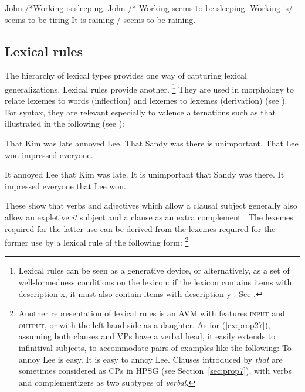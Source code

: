 \documentclass[output=paper
	        ,collection
	        ,collectionchapter
 	        ,biblatex
                ,babelshorthands
                ,newtxmath
                ,draftmode
                ,colorlinks, citecolor=brown
]{langscibook}
\begin{document}
\ea\label{ex:prop25}
	\ea John /*Working is sleeping.
	\ex John /* Working seems to be sleeping.
	\ex Working is/ seems to be tiring
	\ex It is raining / seems to be raining.
	\z
\z

\subsection{Lexical rules}\label{sec:prop4.2}
\label{prop:sec-lex-rules}

The hierarchy of lexical types provides one way of capturing lexical generalizations. Lexical rules provide another.%
%
\footnote{Lexical rules can be seen as a generative device, or alternatively, as a set of well-formedness conditions on the lexicon: if the lexicon contains items with description x, it must also contain items with description y \citep{Meurers2001a}. See .}
%
They are used in morphology to relate lexemes to words (inflection) and lexemes to lexemes (derivation) (see ). For syntax, they are relevant especially to valence alternations such as that illustrated in the following (see ):

\ea\label{ex:prop26}
	\ea That Kim was late annoyed Lee.
	\ex That Sandy was there is unimportant. 
	\ex That Lee won impressed everyone.
	\z
	
\ex\label{ex:prop27}
	\ea It annoyed Lee that Kim was late.
	\ex It is unimportant that Sandy was there. 
	\ex It impressed everyone that Lee won.
	\z
\z

These show that verbs and adjectives which allow a clausal subject generally also allow an expletive \emph{it} subject and a clause as an extra complement \citep[150]{ps2}. The lexemes required for the latter use can be derived from the lexemes required for the former use by a lexical rule of the following form:%
%
\footnote{Another representation of lexical rules is an AVM with features \textsc{input} and \textsc{output}, or with the left hand side as a daughter. As for (\ref{ex:prop27}), assuming both clauses and VPs have a verbal head, it easily extends to infinitival subjects, to accommodate pairs of examples like the following:
	\ea To annoy Lee is easy.
	\ex It is easy to annoy Lee.
	\z
Clauses introduced by \emph{that} are sometimes considered as CPs in HPSG (see Section~\ref{sec:prop7}), with verbs and complementizers as two subtypes of \emph{verbal}.
	
}
%

\ea\label{ex:prop28}
\avmtmp{[arg-st & <S> \+ \2] $\mapsto$
	[arg-st & <NP![\type{it}]!> \+ \2 \+ <S>]}
\z
\end{document}
